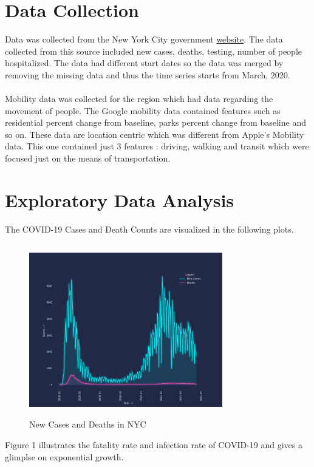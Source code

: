 \documentclass[12pt,a4paper]{article}
\begin{document}
\section*{Data Collection}
Data was collected from the New York City government \href{https://www1.nyc.gov/site/doh/covid/covid-19-data.page}{website}. 
The data collected from this source included new cases, deaths, testing, number of people hospitalized. 
The data had different start dates so the data was merged by removing the missing data and 
thus the time series starts from March, 2020.   
\\\\
Mobility data was collected for the region which had data regarding the movement of people.
The Google mobility data contained features such as residential percent change from baseline,
parks percent change from baseline and so on. These data are location centric which was different
from Apple's Mobility data. This one contained just 3 features : driving, walking and transit which 
were focused just on the means of transportation. 

\section*{Exploratory Data Analysis}
The COVID-19 Cases and Death Counts are visualized in the following plots.
\begin{figure}[H]
    \centering
    \includegraphics[width=0.75\textwidth,height=75mm]{images/deaths.png}
    \caption{New Cases and Deaths in NYC}
\end{figure}


Figure 1 illustrates the fatality rate and infection rate of COVID-19
and gives a glimplse on exponential growth.
\end{document}

